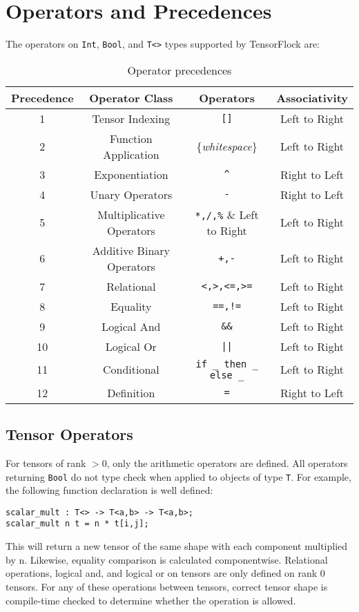 \section{Operators and Precedences}%
\label{sec:operators_and_precedences}

The operators on \verb|Int|, \verb|Bool|, and \verb|T<>| types
supported by TensorFlock are:

\begin{table}[htpb]
    \centering
    \caption{Operator precedences}
    \label{tab:label}
\begin{tabular}{ |c|c|c|c| } 
 \hline
 Precedence & Operator Class & Operators & Associativity\\ 
 \hline
 1 & Tensor Indexing & \verb|[]| & Left to Right\\
 \hline
 2 & Function Application & \{\textit{whitespace}\} & Left to Right \\
 \hline
 3 & Exponentiation & \verb|^| & Right to Left\\
 \hline
 4 & Unary Operators & \verb|-| & Right to Left \\
 \hline
 5 & Multiplicative Operators & \verb|*,/,%| & Left to Right\\
 \hline
 6 & Additive Binary Operators & \verb|+,-| & Left to Right\\
 \hline
 7 & Relational & \verb|<,>,<=,>=| & Left to Right\\
 \hline
 8 & Equality & \verb|==,!=| & Left to Right\\
 \hline
 9 & Logical And & \verb|&&| & Left to Right\\
 \hline
 10 & Logical Or & \verb!||! & Left to Right\\
 \hline
 11 & Conditional & \verb!if _ then _ else _! & Left to Right\\
 \hline
 12 & Definition & \verb|=| & Right to Left\\
 \hline
\end{tabular}
\end{table}

\subsection{Tensor Operators}
For tensors of rank $> 0$, only the arithmetic operators are defined. All
operators returning \verb|Bool| do not type check when applied to objects of
type \verb|T|.
For example, the following function declaration is well defined:
\begin{lstlisting}
scalar_mult : T<> -> T<a,b> -> T<a,b>;
scalar_mult n t = n * t[i,j];
\end{lstlisting}
This will return a new tensor of the same shape with each component multiplied
by n. Likewise, equality comparison is calculated componentwise. Relational
operations, logical and, and logical or on tensors are only defined on rank
0 tensors.  For any of these operations between tensors, correct tensor shape is
compile-time checked to determine whether the operation is allowed.

